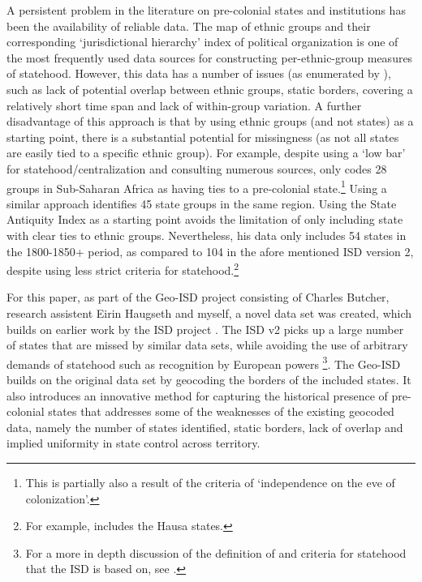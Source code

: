 \documentclass[12pt]{article}
\begin{document}
A persistent problem in the literature on pre-colonial states and institutions
has been the availability of reliable data. The \citet{Murdock1967} map of
ethnic groups and their corresponding `jurisdictional hierarchy' index of
political organization is one of the most frequently used data sources for
constructing per-ethnic-group measures of statehood. However, this data has a
number of issues (as enumerated by \citet{Michalopoulos2018}), such as lack of
potential overlap between ethnic groups, static borders, covering a relatively
short time span and lack of within-group variation. A further disadvantage of
this approach is that by using ethnic groups (and not states) as a starting
point, there is a substantial potential for missingness (as not all states are
easily tied to a specific ethnic group). For example, \citet{Paine2019} despite
using a `low bar' for statehood/centralization and consulting numerous sources,
only codes 28 groups in Sub-Saharan Africa as having ties to a pre-colonial
state.\footnote{This is partially also a result of the criteria of `independence
on the eve of colonization'.} Using a similar approach \citet{Wig2016}
identifies 45 state groups in the same region. Using the State Antiquity Index
\citep{Bockstette2012} as a starting point \citet{Depetris-Chauvin2016} avoids
the limitation of only including state with clear ties to ethnic groups.
Nevertheless, his data only includes 54 states in the 1800-1850+ period, as
compared to 104 in the afore mentioned ISD version 2, despite using less strict
criteria for statehood.\footnote{For example, \citet{Depetris-Chauvin2016}
includes the Hausa states.}


For this paper, as part of the Geo-ISD project consisting of Charles Butcher,
research assistent Eirin Haugseth and myself, a novel data set was created,
which builds on earlier work by the ISD project \citep{Butcher2020}. The ISD v2
picks up a large number of states that are missed by similar data sets, while
avoiding the use of arbitrary demands of statehood such as recognition by
European powers \citep{Butcher2020}\footnote{For a more in depth discussion of
	the definition of and criteria for statehood that the ISD is based on,
see \citet{Butcher2017}.}. The Geo-ISD builds on the original data set by
geocoding the borders of the included states. It also introduces an innovative
method for capturing the historical presence of pre-colonial states that
addresses some of the weaknesses of the existing geocoded data, namely the
number of states identified, static borders, lack of overlap and implied
uniformity in state control across territory.
\end{document}
